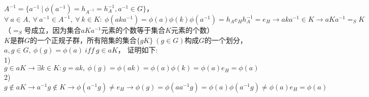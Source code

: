 $A^{-1}=\{a^{-1}\ |\ \phi(a^{-1})=h_{A^{-1}}=h_{A}^{-1}, a^{-1}\in G\}$，
$\forall\ a\in A,\ \forall\ a^{-1}\in A^{-1},\ \forall\ k\in K:\ \phi(aka^{-1})=\phi(a)\phi(k)\phi(a^{-1})=h_{A}e_{H}h_{A}^{-1}=e_{H}
\rightarrow aka^{-1}\in K
\rightarrow aKa^{-1}=_{S} K$
（$=_{S}$号成立，因为集合$aKa^{-1}$元素的个数等于集合$K$元素的个数）
\\

$K$是群$G$的一个正规子群，所有陪集的集合$\{gK\}\ (g\in G)$构成$G$的一个划分，
$a,g\in G,\ \phi(g)=\phi(a)\ iff\ g\in aK$，
证明如下:
\\
1)$g\in aK\rightarrow \exists k\in K:g=ak,\ \phi(g)=\phi(ak)=\phi(a)\phi(k)=\phi(a)e_{H}=\phi(a)$
\\
2)$g\notin aK\rightarrow a^{-1}g\notin K\rightarrow \phi(a^{-1}g)\neq e_{H}
\rightarrow \phi(g)=\phi(aa^{-1}g)=\phi(a)\phi(a^{-1}g)\neq \phi(a)e_{H}=\phi(a)$

